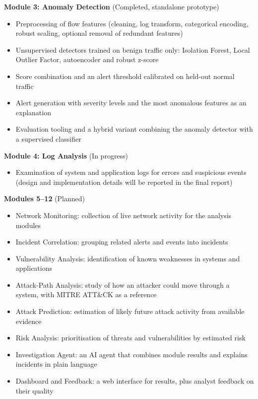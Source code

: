     \textbf{Module 3: Anomaly Detection} (Completed, standalone prototype)
    \begin{itemize}
      \setlength{\itemsep}{1pt}
      \setlength{\parskip}{0pt}
      \setlength{\parsep}{0pt}
      \item Preprocessing of flow features (cleaning, log transform, categorical encoding, robust scaling, optional removal of redundant features)
      \item Unsupervised detectors trained on benign traffic only: Isolation Forest, Local Outlier Factor, autoencoder and robust z-score
      \item Score combination and an alert threshold calibrated on held-out normal traffic
      \item Alert generation with severity levels and the most anomalous features as an explanation
      \item Evaluation tooling and a hybrid variant combining the anomaly detector with a supervised classifier
    \end{itemize}

    \textbf{Module 4: Log Analysis} (In progress)
    \begin{itemize}
      \setlength{\itemsep}{1pt}
      \setlength{\parskip}{0pt}
      \setlength{\parsep}{0pt}
      \item Examination of system and application logs for errors and suspicious events (design and implementation details will be reported in the final report)
    \end{itemize}

    \textbf{Modules 5--12} (Planned)
    \begin{itemize}
      \setlength{\itemsep}{1pt}
      \setlength{\parskip}{0pt}
      \setlength{\parsep}{0pt}
      \item Network Monitoring: collection of live network activity for the analysis modules
      \item Incident Correlation: grouping related alerts and events into incidents
      \item Vulnerability Analysis: identification of known weaknesses in systems and applications
      \item Attack-Path Analysis: study of how an attacker could move through a system, with MITRE ATT\&CK \cite{strom2018attack} as a reference
      \item Attack Prediction: estimation of likely future attack activity from available evidence
      \item Risk Analysis: prioritisation of threats and vulnerabilities by estimated risk
      \item Investigation Agent: an AI agent that combines module results and explains incidents in plain language
      \item Dashboard and Feedback: a web interface for results, plus analyst feedback on their quality
    \end{itemize}
